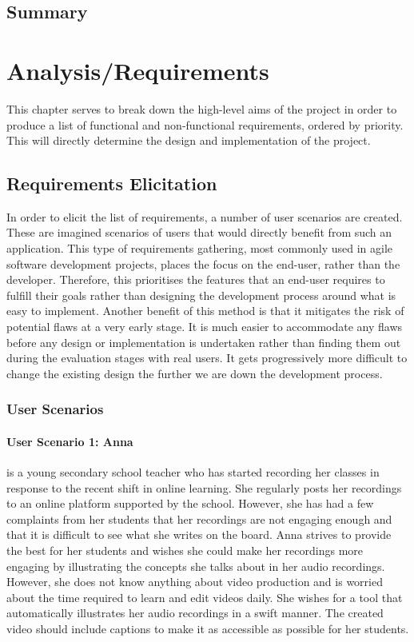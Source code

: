 \documentclass{l4proj}
\begin{document}
\section{Summary}







\chapter{Analysis/Requirements}
This chapter serves to break down the high-level aims of the project in order to produce a list of functional and non-functional requirements, ordered by priority. This will directly determine the design and implementation of the project.

\section{Requirements Elicitation}
In order to elicit the list of requirements, a number of user scenarios are created. These are imagined scenarios of users that would directly benefit from such an application. This type of requirements gathering, most commonly used in agile software development projects, places the focus on the end-user, rather than the developer. Therefore, this prioritises the features that an end-user requires to fulfill their goals rather than designing the development process around what is easy to implement. Another benefit of this method is that it mitigates the risk of potential flaws at a very early stage. It is much easier to accommodate any flaws before any design or implementation is undertaken rather than finding them out during the evaluation stages with real users. It gets progressively more difficult to change the existing design the further we are down the development process.


\subsection{User Scenarios}
\subsubsection{User Scenario 1: Anna} is a young secondary school teacher who has started recording her classes in response to the recent shift in online learning. She regularly posts her recordings to an online platform supported by the school. However, she has had a few complaints from her students that her recordings are not engaging enough and that it is difficult to see what she writes on the board. Anna strives to provide the best for her students and wishes she could make her recordings more engaging by illustrating the concepts she talks about in her audio recordings. However, she does not know anything about video production and is worried about the time required to learn and edit videos daily. She wishes for a tool that automatically illustrates her audio recordings in a swift manner. The created video should include captions to make it as accessible as possible for her students.
\end{document}
